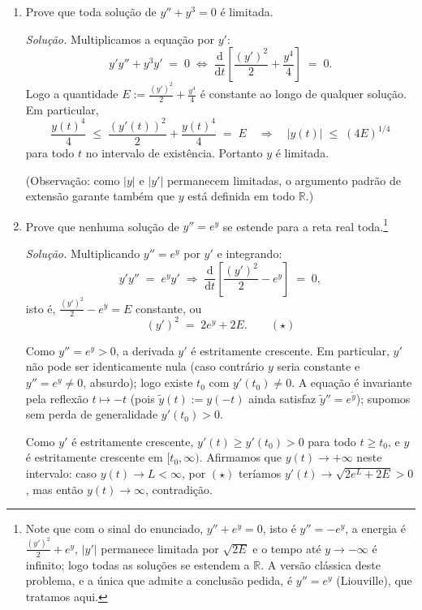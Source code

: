 \documentclass[10pt,a4paper]{amsart}
\newcommand{\R}{\mathbb{R}}
\renewcommand{\d}{\mathrm{d}}
\begin{document}
\begin{enumerate}[label=(\alph*)]
    \item Prove que toda solução de $y'' + y^3 = 0$ é limitada.

    \emph{Solução.} Multiplicamos a equação por $y'$:
    \[
        y' y'' + y^3 y' \;=\; 0 \;\Longleftrightarrow\; \frac{\d}{\d t}\!\left[ \frac{(y')^2}{2} + \frac{y^4}{4} \right] \;=\; 0.
    \]
    Logo a quantidade $E := \frac{(y')^2}{2} + \frac{y^4}{4}$ é constante ao longo de qualquer solução. Em particular,
    \[
        \frac{y(t)^4}{4} \;\leq\; \frac{(y'(t))^2}{2} + \frac{y(t)^4}{4} \;=\; E
        \quad\Longrightarrow\quad |y(t)| \;\leq\; (4 E)^{1/4}
    \]
    para todo $t$ no intervalo de existência. Portanto $y$ é limitada.

    (Observação: como $|y|$ e $|y'|$ permanecem limitadas, o argumento padrão de extensão garante também que $y$ está definida em todo $\R$.)

    \item Prove que nenhuma solução de $y'' = e^{y}$ se estende para a reta real toda.\footnote{Note que com o sinal do enunciado, $y'' + e^y = 0$, isto é $y'' = -e^y$, a energia é $\tfrac{(y')^2}{2} + e^y$, $|y'|$ permanece limitada por $\sqrt{2 E}$ e o tempo até $y \to -\infty$ é infinito; logo todas as soluções se estendem a $\R$. A versão clássica deste problema, e a única que admite a conclusão pedida, é $y'' = e^y$ (Liouville), que tratamos aqui.}

    \emph{Solução.} Multiplicando $y'' = e^y$ por $y'$ e integrando:
    \[
        y' y'' \;=\; e^y y' \;\Longrightarrow\; \frac{\d}{\d t}\!\left[ \frac{(y')^2}{2} - e^y \right] \;=\; 0,
    \]
    isto é, $\frac{(y')^2}{2} - e^y = E$ constante, ou
    \[
        (y')^2 \;=\; 2 e^y + 2 E. \qquad (\star)
    \]

    Como $y'' = e^y > 0$, a derivada $y'$ é estritamente crescente. Em particular, $y'$ não pode ser identicamente nula (caso contrário $y$ seria constante e $y'' = e^y \neq 0$, absurdo); logo existe $t_0$ com $y'(t_0) \neq 0$. A equação é invariante pela reflexão $t \mapsto -t$ (pois $\widetilde y(t) := y(-t)$ ainda satisfaz $\widetilde y'' = e^{\widetilde y}$); supomos sem perda de generalidade $y'(t_0) > 0$.

    Como $y'$ é estritamente crescente, $y'(t) \geq y'(t_0) > 0$ para todo $t \geq t_0$, e $y$ é estritamente crescente em $[t_0, \infty)$. Afirmamos que $y(t) \to +\infty$ neste intervalo: caso $y(t) \to L < \infty$, por $(\star)$ teríamos $y'(t) \to \sqrt{2 e^L + 2 E} > 0$, mas então $y(t) \to \infty$, contradição.


\end{enumerate}
\end{document}
